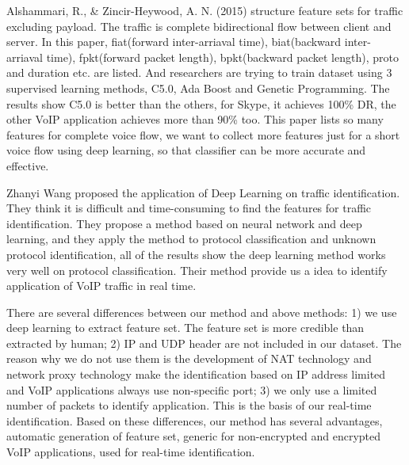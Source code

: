 \documentclass[conference]{IEEEtran}
\begin{document}
Alshammari, R., \& Zincir-Heywood, A. N. (2015) \cite{5} structure feature sets for traffic excluding payload. The traffic is complete bidirectional flow between client and server. In this paper, fiat(forward inter-arriaval time), biat(backward inter-arriaval time), fpkt(forward packet length), bpkt(backward packet length), proto and duration etc. are listed. And researchers are trying to train dataset using 3 supervised learning methods, C5.0, Ada Boost and Genetic Programming. The results show C5.0 is better than the others, for Skype, it achieves 100\% DR, the other VoIP application achieves more than 90\% too. This paper lists so many features for complete voice flow, we want to collect more features just for a short voice flow using deep learning, so that classifier can be more accurate and effective.

Zhanyi Wang \cite{1} proposed the application of Deep Learning on traffic identification. They think it is difficult and time-consuming to find the features for traffic identification. They propose a method based on neural network and deep learning, and they apply the method to protocol classification and unknown protocol identification, all of the results show the deep learning method works very well on protocol classification. Their method provide us a idea to identify application of VoIP traffic in real time.

There are several differences between our method and above methods: 1) we use deep learning to extract feature set. The feature set is more credible than extracted by human; 2) IP and UDP header are not included in our dataset. The reason why we do not use them is the development of NAT technology and network proxy technology make the identification based on IP address limited and VoIP applications always use non-specific port; 3) we only use a limited number of packets to identify application. This is the basis of our real-time identification. Based on these differences, our method has several advantages, automatic generation of feature set, generic for non-encrypted and encrypted VoIP applications, used for real-time identification.
\end{document}

